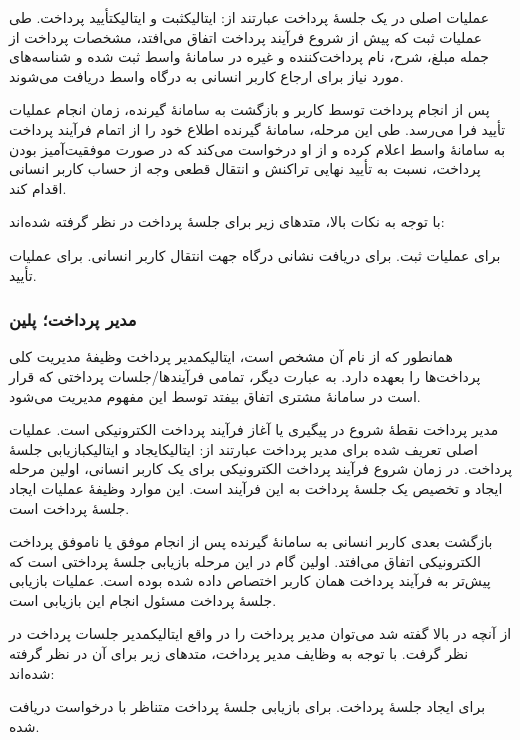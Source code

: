 عملیات اصلی در یک جلسهٔ پرداخت عبارتند از:
‌ایتالیک{ثبت} و
‌ایتالیک{تأیید} پرداخت.
طی عملیات ثبت که پیش از شروع فرآیند پرداخت
اتفاق می‌افتد، مشخصات پرداخت از جمله مبلغ،
شرح، نام پرداخت‌کننده و غیره در سامانهٔ واسط
ثبت شده و شناسه‌های مورد نیاز برای ارجاع
کاربر انسانی به درگاه واسط دریافت می‌شوند.

پس از انجام پرداخت توسط کاربر و
بازگشت به سامانهٔ گیرنده، زمان انجام
عملیات تأیید فرا می‌رسد. طی این مرحله، سامانهٔ
گیرنده اطلاع خود را از اتمام فرآیند پرداخت
به سامانهٔ واسط اعلام کرده و از او درخواست می‌کند
که در صورت موفقیت‌آمیز بودن پرداخت، نسبت به
تأیید نهایی تراکنش و انتقال قطعی وجه از حساب
کاربر انسانی اقدام کند.

با توجه به نکات بالا، متدهای زیر برای جلسهٔ پرداخت
در نظر گرفته شده‌اند:
\begin{itemize}
	  برای عملیات ثبت.
	  برای دریافت نشانی
	درگاه جهت انتقال کاربر انسانی.
	  برای عملیات تأیید.
\end{itemize}

\subsubsection{مدیر پرداخت؛ ‌پلین{}}
همانطور که از نام آن مشخص است،
‌ایتالیک{مدیر پرداخت} وظیفهٔ مدیریت کلی
پرداخت‌ها را بعهده دارد. به عبارت دیگر، تمامی
فرآیندها/جلسات پرداختی که قرار است در سامانهٔ
مشتری اتفاق بیفتد توسط این مفهوم مدیریت می‌شود.

مدیر پرداخت نقطهٔ شروع در پیگیری یا آغاز فرآیند
پرداخت الکترونیکی است. عملیات اصلی تعریف شده برای
مدیر پرداخت عبارتند از: ‌ایتالیک{ایجاد} و
‌ایتالیک{بازیابی} جلسهٔ پرداخت. در زمان شروع
فرآیند پرداخت الکترونیکی برای یک کاربر انسانی،
اولین مرحله ایجاد و تخصیص یک جلسهٔ پرداخت به
این فرآیند است. این موارد وظیفهٔ عملیات ایجاد
جلسهٔ پرداخت است.

بازگشت بعدی کاربر انسانی به سامانهٔ گیرنده
پس از انجام موفق یا ناموفق پرداخت الکترونیکی
اتفاق می‌افتد. اولین گام در این مرحله بازیابی
جلسهٔ پرداختی است که پیش‌تر به فرآیند پرداخت
همان کاربر اختصاص داده شده بوده است. عملیات
بازیابی جلسهٔ پرداخت مسئول انجام این بازیابی
است.

از آنچه در بالا گفته شد می‌توان مدیر پرداخت را در
واقع ‌ایتالیک{مدیر جلسات پرداخت} در نظر گرفت.
 با توجه به وظایف مدیر پرداخت، متدهای زیر برای
 آن در نظر گرفته شده‌اند:
 
 \begin{itemize}
 	  برای ایجاد جلسهٔ پرداخت.
 	  برای بازیابی جلسهٔ پرداخت متناظر با درخواست دریافت شده.
 \end{itemize}
 
 
 